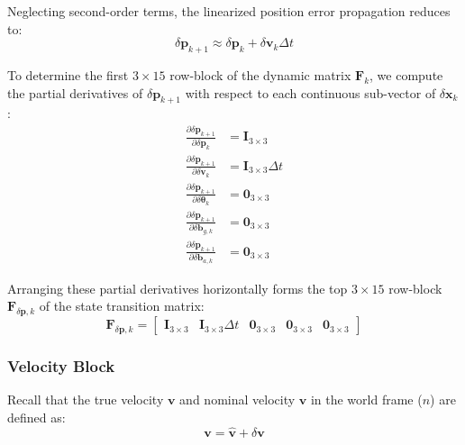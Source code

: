 \documentclass{article}
\begin{document}
	Neglecting second-order terms, the linearized position error propagation reduces to:
	\begin{equation*}
		\delta\mathbf{p}_{k+1} \approx \delta\mathbf{p}_k + \delta\mathbf{v}_k \Delta t
	\end{equation*}
	
	To determine the first $3 \times 15$ row-block of the dynamic matrix $\mathbf{F}_k$, we compute the partial derivatives of $\delta\mathbf{p}_{k+1}$ with respect to each continuous sub-vector of $\delta\mathbf{x}_k$:
	\begin{align*}
		\frac{\partial \delta\mathbf{p}_{k+1}}{\partial \delta\mathbf{p}_k} &= \mathbf{I}_{3 \times 3} \\
		\frac{\partial \delta\mathbf{p}_{k+1}}{\partial \delta\mathbf{v}_k} &= \mathbf{I}_{3 \times 3} \Delta t \\
		\frac{\partial \delta\mathbf{p}_{k+1}}{\partial \delta\bm{\theta}_k} &= \mathbf{0}_{3 \times 3} \\
		\frac{\partial \delta\mathbf{p}_{k+1}}{\partial \delta\mathbf{b}_{g,k}} &= \mathbf{0}_{3 \times 3} \\
		\frac{\partial \delta\mathbf{p}_{k+1}}{\partial \delta\mathbf{b}_{a,k}} &= \mathbf{0}_{3 \times 3}
	\end{align*}
	
	Arranging these partial derivatives horizontally forms the top $3 \times 15$ row-block $\mathbf{F}_{\delta\mathbf{p}, k}$ of the state transition matrix:
	\begin{equation*}
		\mathbf{F}_{\delta\mathbf{p}, k} = 
		\begin{bmatrix}
			\mathbf{I}_{3 \times 3} & \mathbf{I}_{3 \times 3} \Delta t & \mathbf{0}_{3 \times 3} & \mathbf{0}_{3 \times 3} & \mathbf{0}_{3 \times 3}
		\end{bmatrix}
	\end{equation*}
	
	\subsubsection{Velocity Block}
	Recall that the true velocity $\mathbf{v}$ and nominal velocity $\hat{\mathbf{v}}$ in the world frame ($n$) are defined as:
	\begin{equation*}
		\mathbf{v} = \hat{\mathbf{v}} + \delta\mathbf{v}
	\end{equation*}
	
\end{document}
